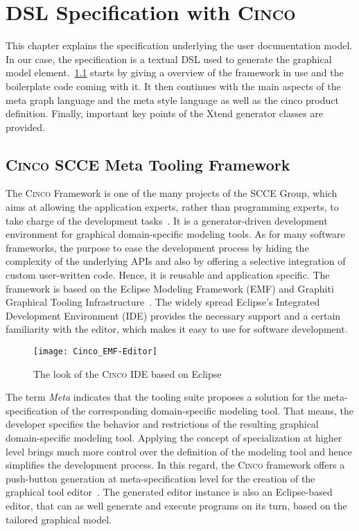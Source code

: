 
\chapter{DSL Specification with \textsc{Cinco}}\label{ch:DSL}

This chapter explains the specification underlying the user documentation model.  In our case, the specification is a textual DSL used to generate the graphical model element.~\ref{sec:CTF} starts by giving a overview of the framework in use and the boilerplate code coming with it. It then continues with the main aspects of the meta graph language and the meta style language as well as the cinco product definition. Finally, important key points of the Xtend generator classes are provided.

\section{\textsc{Cinco} SCCE Meta Tooling Framework}\label{sec:CTF}

The \textsc{Cinco} Framework is one of the many projects of the SCCE Group, which aims at allowing the application experts, rather than programming experts, to take charge of the development tasks~\cite{scce}. It is a generator-driven development environment for graphical domain-specific modeling tools. As for many software frameworks, the purpose to ease the development process by hiding the complexity of the underlying APIs and also by offering a selective integration of custom user-written code. Hence, it is reusable and application specific. The framework is based on the Eclipse Modeling Framework (EMF) and Graphiti Graphical Tooling Infrastructure~\cite{Cinco}. The widely spread Eclipse's Integrated Development Environment (IDE) provides the necessary support and a certain familiarity with the editor, which makes it easy to use for software development.
\begin{figure}[h]
    \texttt{[image: Cinco\_EMF-Editor]}
    \caption{The look of the \textsc{Cinco} IDE based on Eclipse}
\end{figure}

The term \textit{Meta} indicates that the tooling suite proposes a solution for the meta-specification of the corresponding domain-specific modeling tool. That means, the developer specifies the behavior and restrictions of the resulting graphical domain-specific modeling tool. Applying the concept of specialization at higher level brings much more control over the definition of the modeling tool and hence simplifies the development process. In this regard, the \textsc{Cinco} framework offers a push-button generation at meta-specification level for the creation of the graphical tool editor~\cite{scce}. The generated editor instance is also an Eclipse-based editor, that can as well generate and execute programs on its turn, based on the tailored graphical model.

